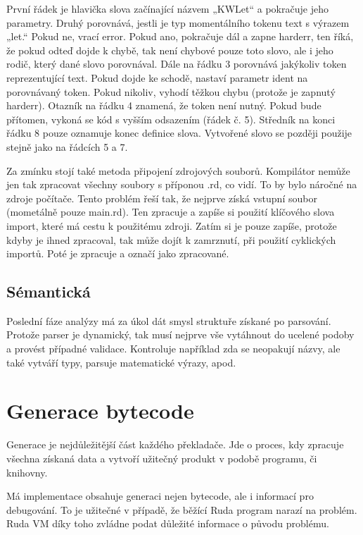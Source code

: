\documentclass[12pt, a4paper,
twoside,        %
openright
]{report}
\begin{document}
První řádek je hlavička slova začínající názvem „KWLet“ a pokračuje jeho parametry. Druhý porovnává, jestli je typ momentálního tokenu text s výrazem „let.“ Pokud ne, vrací error. Pokud ano, pokračuje dál a zapne harderr, ten říká, že pokud odteď dojde k chybě, tak není chybové pouze toto slovo, ale i jeho rodič, který dané slovo porovnával. Dále na řádku 3 porovnává jakýkoliv token reprezentující text. Pokud dojde ke schodě, nastaví parametr ident na porovnávaný token. Pokud nikoliv, vyhodí těžkou chybu (protože je zapnutý harderr). Otazník na řádku 4 znamená, že token není nutný. Pokud bude přítomen, vykoná se kód s vyšším odsazením (řádek č. 5). Středník na konci řádku 8 pouze oznamuje konec definice slova. Vytvořené slovo se později použije stejně jako na řádcích 5 a 7.

Za zmínku stojí také metoda připojení zdrojových souborů. Kompilátor nemůže jen tak zpracovat všechny soubory s příponou .rd, co vidí. To by bylo náročné na zdroje počítače. Tento problém řeší tak, že nejprve získá vstupní soubor (mometálně pouze main.rd). Ten zpracuje a zapíše si použití klíčového slova import, které má cestu k použitému zdroji. Zatím si je pouze zapíše, protože kdyby je ihned zpracoval, tak může dojít k zamrznutí, při použití cyklických importů. Poté je zpracuje a označí jako zpracované.

\cleardoublepage


\subsection{Sémantická}

Poslední fáze analýzy má za úkol dát smysl struktuře získané po parsování. Protože parser je dynamický, tak musí nejprve vše vytáhnout do ucelené podoby a provést případné validace. Kontroluje například zda se neopakují názvy, ale také vytváří typy, parsuje matematické výrazy, apod.


\section{Generace bytecode}

Generace je nejdůležitější část každého překladače. Jde o proces, kdy zpracuje všechna získaná data a vytvoří užitečný produkt v podobě programu, či knihovny.

Má implementace obsahuje generaci nejen bytecode, ale i informací pro debugování. To je užitečné v případě, že běžící Ruda program narazí na problém. Ruda VM díky toho zvládne podat důležité informace o původu problému.
\end{document}
